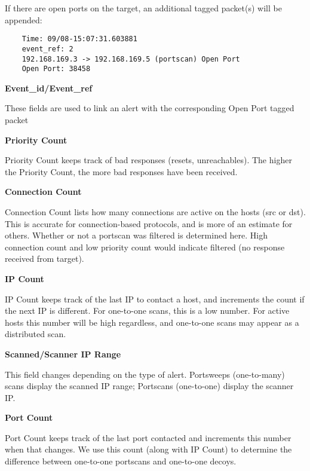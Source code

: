 \documentclass[english]{report}
\newcounter{slistnum}
\newenvironment{slist}
{ \begin{list}{ {\bf \arabic{slistnum}.} }{\usecounter{slistnum} } }
{ \end{list} }
\begin{document}
If there are open ports on the target, an additional tagged packet(s) will be
appended:

\begin{verbatim}
	Time: 09/08-15:07:31.603881
	event_ref: 2
	192.168.169.3 -> 192.168.169.5 (portscan) Open Port
	Open Port: 38458
\end{verbatim}

\begin{slist}
  \item \textbf{Event\_id/Event\_ref}

     These fields are used to link an alert with the corresponding 
     Open Port tagged packet

  \item \textbf{Priority Count}

     Priority Count keeps track of bad responses (resets,
     unreachables). The higher the Priority Count, the more bad
     responses have been received.

  \item \textbf{Connection Count}
     
     Connection Count lists how many connections are active on the
     hosts (src or dst). This is accurate for connection-based
     protocols, and is more of an estimate for others. Whether or not a
     portscan was filtered is determined here. High connection count and
     low priority count would indicate filtered (no response received
     from target).

  \item \textbf{IP Count}

     IP Count keeps track of the last IP to contact a host, and
     increments the count if the next IP is different. For one-to-one
     scans, this is a low number. For active hosts this number will
     be high regardless, and one-to-one scans may appear as a
     distributed scan.

  \item \textbf{Scanned/Scanner IP Range}

     This field changes depending on the type of alert. Portsweeps
     (one-to-many) scans display the scanned IP range; Portscans
     (one-to-one) display the scanner IP. 

 \item \textbf{Port Count}

     Port Count keeps track of the last port contacted and increments
     this number when that changes. We use this count (along with IP
     Count) to determine the difference between one-to-one portscans
     and one-to-one decoys.
\end{slist}
\end{document}
